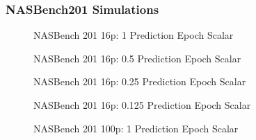 \documentclass[twocolumn]{article}
\begin{document}
\FloatBarrier
\clearpage
\subsubsection{NASBench201 Simulations}

\begin{figure}[!h]
    \begin{center}
        \resizebox{0.9\columnwidth}{!}{
            
        }
        \caption{NASBench 201 16p: 1 Prediction Epoch Scalar}
        \label{fig:nasbench_16_1x_acceleration}
    \end{center}
\end{figure}

\begin{figure}[!h]
    \begin{center}
        \resizebox{0.95\columnwidth}{!}{
            
        }
        \caption{NASBench 201 16p: 0.5 Prediction Epoch Scalar}
        \label{fig:nasbench_16_2x_acceleration}
    \end{center}
\end{figure}

\begin{figure}[!h]
    \begin{center}
        \resizebox{0.95\columnwidth}{!}{
            
        }
        \caption{NASBench 201 16p: 0.25 Prediction Epoch Scalar}
        \label{fig:nasbench_16_4x_acceleration}
    \end{center}
\end{figure}

\begin{figure}[!h]
    \begin{center}
        \resizebox{0.95\columnwidth}{!}{
            
        }
        \caption{NASBench 201 16p: 0.125 Prediction Epoch Scalar}
        \label{fig:nasbench_16_8x_acceleration}
    \end{center}
\end{figure}

\begin{figure}[!h]
    \begin{center}
        \resizebox{0.9\columnwidth}{!}{
            
        }
        \caption{NASBench 201 100p: 1 Prediction Epoch Scalar}
        \label{fig:nasbench_100_1x_acceleration}
    \end{center}
\end{figure}
\end{document}
